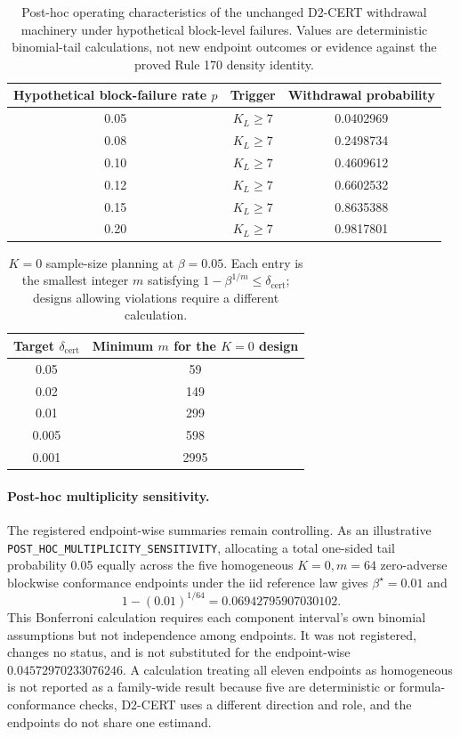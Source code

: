 \begin{table}[htbp]
\centering
\caption{Post-hoc operating characteristics of the unchanged D2-CERT withdrawal machinery under
hypothetical block-level failures. Values are deterministic binomial-tail calculations, not new
endpoint outcomes or evidence against the proved Rule 170 density identity.}\label{tab:d2-power}
\begin{tabular}{ccc}
\toprule
Hypothetical block-failure rate \(p\) & Trigger & Withdrawal probability \\
\midrule
0.05 & \(K_L\ge7\) & 0.0402969 \\
0.08 & \(K_L\ge7\) & 0.2498734 \\
0.10 & \(K_L\ge7\) & 0.4609612 \\
0.12 & \(K_L\ge7\) & 0.6602532 \\
0.15 & \(K_L\ge7\) & 0.8635388 \\
0.20 & \(K_L\ge7\) & 0.9817801 \\
\bottomrule
\end{tabular}
\end{table}

\begin{table}[htbp]
\centering
\caption{\(K=0\) sample-size planning at \(\beta=0.05\). Each entry is the smallest integer
\(m\) satisfying \(1-\beta^{1/m}\le\delta_{\mathrm{cert}}\); designs allowing violations require a different
calculation.}\label{tab:k0-planning}
\begin{tabular}{cc}
\toprule
Target \(\delta_{\mathrm{cert}}\) & Minimum \(m\) for the \(K=0\) design \\
\midrule
0.05 & 59 \\
0.02 & 149 \\
0.01 & 299 \\
0.005 & 598 \\
0.001 & 2995 \\
\bottomrule
\end{tabular}
\end{table}

\paragraph{Post-hoc multiplicity sensitivity.}
The registered endpoint-wise summaries remain controlling. As an illustrative
\texttt{POST\_HOC\_MULTIPLICITY\_SENSITIVITY}, allocating a total one-sided tail probability
0.05 equally across the five homogeneous \(K=0,m=64\) zero-adverse blockwise conformance
endpoints under the iid reference law gives
\(\beta^\star=0.01\) and
\[
1-(0.01)^{1/64}=0.06942795907030102.
\]
This Bonferroni calculation requires each component interval's own binomial assumptions but not
independence among endpoints. It was not registered, changes no status, and is not substituted for
the endpoint-wise \(0.04572970233076246\). A calculation treating all eleven endpoints as
homogeneous is not reported as a family-wide result because five are deterministic or
formula-conformance checks, D2-CERT uses a different direction and role, and the endpoints do not
share one estimand.

